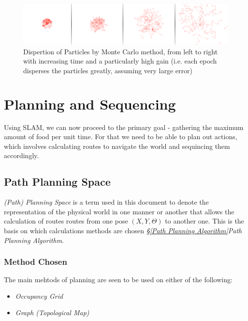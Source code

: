 \documentclass[11pt, a4paper]{article}
\begin{document}
\begin{figure}[t]
  \includegraphics[width=\textwidth]{../assets/particle-disperse-random.png}
  \caption{
    \label{fig:particle-disperse}
    Dispertion of Particles by Monte Carlo method, from left to right with increasing time and 
    a particularly high gain (i.e. each epoch disperses the particles greatly, assuming very large error)
  }
\end{figure}




\section{Planning and Sequencing}

Using SLAM, we can now proceed to the primary goal - gathering the maximum amount of food per unit time. For that we need to be able to plan out actions, which involves calculating routes to navigate the world and sequincing them accordingly.

\subsection{Path Planning Space}
\label{Planning Space}

\textit{(Path) Planning Space} is a term used  in this document to denote the representation of the physical world in one manner or another that allows the calculation of routes routes from one pose $(X,Y, \Theta)$ to another one. This is the basis on which calculations methods are chosen \textit{\S\ref{Path Planning Algorithm}Path Planning Algorithm}. 

\subsubsection{Method Chosen}

The main mehtods\cite{path_space} of planning are seen to be used on either of the following:

\begin{itemize}
	\item \textit{Occupancy Grid}
	\item \textit{Graph (Topological Map)}
\end{itemize}
\end{document}
